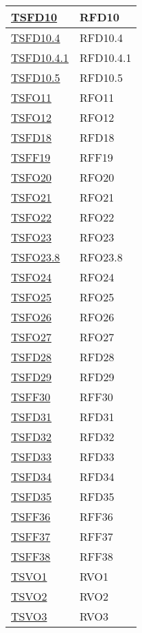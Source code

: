 \begin{longtable}[ht]{|>{\centering}m{5cm}|m{5cm}<{\centering}|}
\hyperlink{TSFD10}{TSFD10} & RFD10\\ \hline
\hyperlink{TSFD10.4}{TSFD10.4} & RFD10.4\\ \hline
\hyperlink{TSFD10.4.1}{TSFD10.4.1} & RFD10.4.1\\ \hline
\hyperlink{TSFD10.5}{TSFD10.5} & RFD10.5\\ \hline
\hyperlink{TSFO11}{TSFO11} & RFO11\\ \hline
\hyperlink{TSFO12}{TSFO12} & RFO12\\ \hline
\hyperlink{TSFD18}{TSFD18} & RFD18\\ \hline
\hyperlink{TSFF19}{TSFF19} & RFF19\\ \hline
\hyperlink{TSFO20}{TSFO20} & RFO20\\ \hline
\hyperlink{TSFO21}{TSFO21} & RFO21\\ \hline
\hyperlink{TSFO22}{TSFO22} & RFO22\\ \hline
\hyperlink{TSFO23}{TSFO23} & RFO23\\ \hline
\hyperlink{TSFO23.8}{TSFO23.8} & RFO23.8\\ \hline
\hyperlink{TSFO24}{TSFO24} & RFO24\\ \hline
\hyperlink{TSFO25}{TSFO25} & RFO25\\ \hline
\hyperlink{TSFO26}{TSFO26} & RFO26\\ \hline
\hyperlink{TSFO27}{TSFO27} & RFO27\\ \hline
\hyperlink{TSFD28}{TSFD28} & RFD28\\ \hline
\hyperlink{TSFD29}{TSFD29} & RFD29\\ \hline
\hyperlink{TSFF30}{TSFF30} & RFF30\\ \hline
\hyperlink{TSFD31}{TSFD31} & RFD31\\ \hline
\hyperlink{TSFD32}{TSFD32} & RFD32\\ \hline
\hyperlink{TSFD33}{TSFD33} & RFD33\\ \hline
\hyperlink{TSFD34}{TSFD34} & RFD34\\ \hline
\hyperlink{TSFD35}{TSFD35} & RFD35\\ \hline
\hyperlink{TSFF36}{TSFF36} & RFF36\\ \hline
\hyperlink{TSFF37}{TSFF37} & RFF37\\ \hline
\hyperlink{TSFF38}{TSFF38} & RFF38\\ \hline
\hyperlink{TSVO1}{TSVO1} & RVO1\\ \hline
\hyperlink{TSVO2}{TSVO2} & RVO2\\ \hline
\hyperlink{TSVO3}{TSVO3} & RVO3\\ \hline

\end{longtable}
